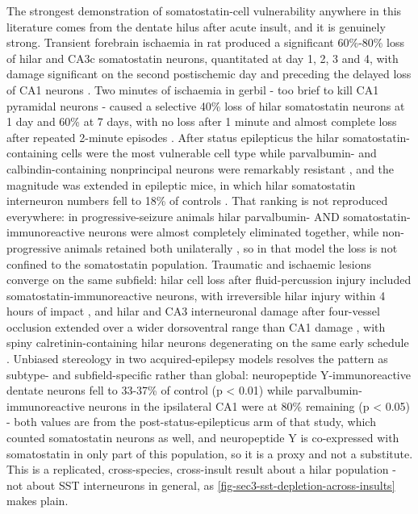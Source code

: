 \documentclass[11pt]{article}
\begin{document}
The strongest demonstration of somatostatin-cell vulnerability anywhere in this literature comes from the dentate hilus after acute insult, and it is genuinely strong. Transient forebrain ischaemia in rat produced a significant 60\%-80\% loss of hilar and CA3c somatostatin neurons, quantitated at day 1, 2, 3 and 4, with damage significant on the second postischemic day and preceding the delayed loss of CA1 neurons \citep{Johansen1987}. Two minutes of ischaemia in gerbil - too brief to kill CA1 pyramidal neurons - caused a selective 40\% loss of hilar somatostatin neurons at 1 day and 60\% at 7 days, with no loss after 1 minute and almost complete loss after repeated 2-minute episodes \citep{Matsuyama1993}. After status epilepticus the hilar somatostatin-containing cells were the most vulnerable cell type while parvalbumin- and calbindin-containing nonprincipal neurons were remarkably resistant \citep{Freund1992}, and the magnitude was extended in epileptic mice, in which hilar somatostatin interneuron numbers fell to 18\% of controls \citep{Hofmann2016}. That ranking is not reproduced everywhere: in progressive-seizure animals hilar parvalbumin- AND somatostatin-immunoreactive neurons were almost completely eliminated together, while non-progressive animals retained both unilaterally \citep{Gorter2001}, so in that model the loss is not confined to the somatostatin population. Traumatic and ischaemic lesions converge on the same subfield: hilar cell loss after fluid-percussion injury included somatostatin-immunoreactive neurons, with irreversible hilar injury within 4 hours of impact \citep{Lowenstein1992}, and hilar and CA3 interneuronal damage after four-vessel occlusion extended over a wider dorsoventral range than CA1 damage \citep{Hsu1993}, with spiny calretinin-containing hilar neurons degenerating on the same early schedule \citep{Freund1993}. Unbiased stereology in two acquired-epilepsy models resolves the pattern as subtype- and subfield-specific rather than global: neuropeptide Y-immunoreactive dentate neurons fell to 33-37\% of control (p < 0.01) while parvalbumin-immunoreactive neurons in the ipsilateral CA1 were at 80\% remaining (p < 0.05) \citep{Huusko2013} - both values are from the post-status-epilepticus arm of that study, which counted somatostatin neurons as well, and neuropeptide Y is co-expressed with somatostatin in only part of this population, so it is a proxy and not a substitute. This is a replicated, cross-species, cross-insult result about a hilar population - not about SST interneurons in general, as \ref{fig-sec3-sst-depletion-across-insults} makes plain.
\end{document}
